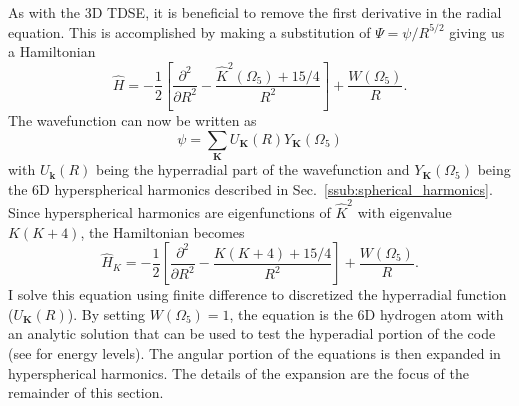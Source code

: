As with the 3D TDSE, it is beneficial to remove the first derivative in the radial equation. This is accomplished by making a substitution of $\Psi = \psi/R^{5/2}$ giving us a Hamiltonian
\begin{equation}
   \hat{H} = -\frac{1}{2} \left[\frac{\partial^2}{\partial R^2} - \frac{\hat{K}^2(\Omega_5)+15/4}{R^2}\right] + \frac{W(\Omega_5)}{R}.
\end{equation}
The wavefunction can now be written as
\begin{equation}
    \psi = \sum\limits_{\mathbf{K}} U_{\mathbf{K}}(R) Y_{\mathbf{K}}(\Omega_5)
\end{equation}
with $U_{\mathbf{k}}(R)$ being the hyperradial part of the wavefunction and $Y_{\mathbf{K}}(\Omega_5)$ being the 6D hyperspherical harmonics described in Sec.~\ref{ssub:spherical_harmonics}. Since hyperspherical harmonics are eigenfunctions of $\hat{K}^2$ with eigenvalue $K(K+4)$, the Hamiltonian becomes
\begin{equation}
   \hat{H}_{K} = -\frac{1}{2} \left[\frac{\partial^2}{\partial R^2} - \frac{K(K+4)+15/4}{R^2}\right] + \frac{W(\Omega_5)}{R}.
\end{equation}
I solve this equation using finite difference to discretized the hyperradial function ($U_{\mathbf{K}}(R)$). By setting $W(\Omega_5)=1$, the equation is the 6D hydrogen atom with an analytic solution that can be used to test the hyperadial portion of the code (see \cite{S_revik_2005} for energy levels). The angular portion of the equations is then expanded in hyperspherical harmonics. The details of the expansion are the focus of the remainder of this section.

